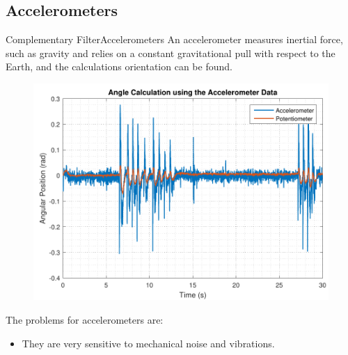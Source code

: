 \subsection{Accelerometers}
\begin{frame}{Complementary Filter}{Accelerometers}
An accelerometer measures inertial force, such as gravity and relies on a constant gravitational pull with respect to the Earth, and the calculations orientation can be found.
\begin{figure}
	\centering
	\includegraphics[scale=0.4]{Pictures/angleAcc.pdf}
\end{figure}

The problems for accelerometers are:
\begin{itemize}
	\item {They are very sensitive to mechanical noise and vibrations.}
\end{itemize}
\end{frame}
